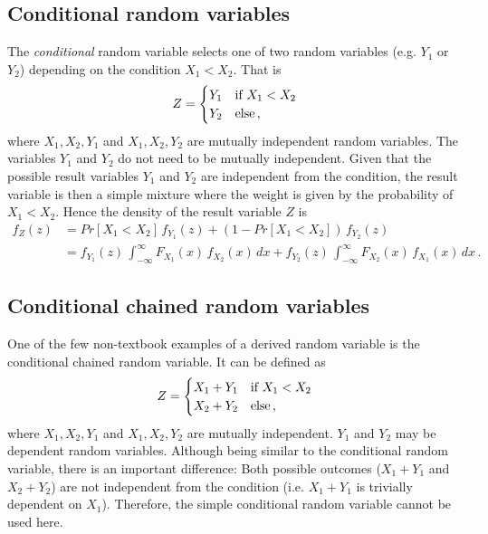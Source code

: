 \subsection{Conditional random variables}
The \emph{conditional} random variable selects one of two random variables (e.g. $Y_1$ or $Y_2$) depending
on the condition $X_1 < X_2$. That is 
\begin{equation}
 Z = \begin{cases}
   Y_1 & \mbox{if } X_1 < X_2\\
   Y_2 & \mbox{else\,,} 
 \end{cases} \nonumber
\end{equation}
where $X_1, X_2, Y_1$ and $X_1, X_2, Y_2$ are mutually independent random variables. The variables
$Y_1$ and $Y_2$ do not need to be mutually independent. Given that the possible result variables $Y_1$
and $Y_2$ are independent from the condition, the result variable is then a simple mixture where the weight
is given by the probability of $X_1<X_2$. Hence the density of the result variable $Z$ is
\begin{align}
 f_Z(z) &= Pr[X_1<X_2]\,f_{Y_1}(z) + \left(1-Pr[X_1<X_2]\right)\,f_{Y_2}(z) \nonumber \\
    &= f_{Y_1}(z)\,\int_{-\infty}^{\infty}F_{X_1}(x)\,f_{X_2}(x)\,dx + 
    f_{Y_2}(z)\,\int_{-\infty}^{\infty}F_{X_2}(x)\,f_{X_1}(x)\,dx\,.\nonumber
\end{align}

\subsection{Conditional chained random variables}
One of the few non-textbook examples of a derived random variable is the conditional chained random variable. 
It can be defined as
\begin{equation}
 Z = \begin{cases}
   X_1 + Y_1 & \mbox{if } X_1 < X_2\\
   X_2 + Y_2 & \mbox{else\,,} 
 \end{cases} \nonumber
\end{equation}
where $X_1, X_2, Y_1$ and $X_1, X_2, Y_2$ are mutually independent. $Y_1$ and $Y_2$ may be 
dependent random variables. Although being similar to the conditional random variable, there is an 
important difference: Both possible outcomes ($X_1+Y_1$ and $X_2+Y_2$) 
are not independent from the condition (i.e. $X_1+Y_1$ is trivially dependent on $X_1$).
Therefore, the simple conditional random variable cannot be used here. 

